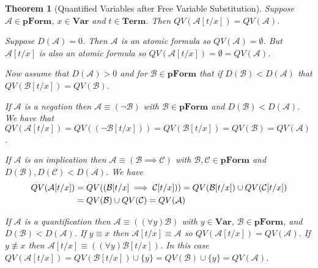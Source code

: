 \documentclass[12pt]{article}
\theoremstyle{break}
\theoremstyle{break}
\newtheorem{theorem}{Theorem}[section]
\theoremstyle{break}
\theoremstyle{break}
\theoremstyle{break}
\newtheorem{informal definition}[definition]{Informal Definition}
\newcommand{\mc}[1]{\mathcal{#1}}
\begin{document}
\begin{theorem}[Quantified Variables after Free Variable Substitution]
\label{thm:qvafterfvsub}
Suppose $\mc{A} \in \textbf{pForm}$, $x\in\textbf{Var}$ and $t\in \textbf{Term}$. Then $QV(\mc{A}[t/x]) = QV(\mc{A})$.

Suppose $D(\mc{A}) = 0$. Then $\mc{A}$ is an atomic formula so $QV(\mc{A}) = \emptyset$. But $\mc{A}[t/x]$ is also an atomic formula so $QV(\mc{A}[t/x]) = \emptyset = QV(\mc{A})$.

Now assume that $D(\mc{A})>0$ and for $\mc{B}\in \textbf{pForm}$ that if $D(\mc{B})<D(\mc{A})$ that $QV(\mc{B}[t/x]) = QV(\mc{B})$.

If $\mc{A}$ is a negation then $\mc{A}\equiv (\lnot \mc{B})$ with $\mc{B}\in\textbf{pForm}$ and $D(\mc{B}) < D(\mc{A})$. We have that $QV(\mc{A}[t/x]) = QV((\lnot \mc{B}[t/x])) = QV(\mc{B}[t/x]) = QV(\mc{B}) =  QV(\mc{A})$.

If $\mc{A}$ is an implication then $\mc{A} \equiv (\mc{B} \implies \mc{C})$ with $\mc{B}, \mc{C} \in \textbf{pForm}$ and $D(\mc{B}), D(\mc{C}) < D(\mc{A})$. We have
\begin{align}
QV(\mc{A}[t/x]) &= QV((\mc{B}[t/x]\implies \mc{C}[t/x])) = QV(\mc{B}[t/x]) \cup QV(\mc{C}[t/x]) \notag\\
&= QV(\mc{B}) \cup QV(\mc{C}) = QV(\mc{A}) \notag
\end{align}

If $\mc{A}$ is a quantification then $\mc{A} \equiv ((\forall y) \mc{B})$ with $y\in \textbf{Var}$, $\mc{B}\in\textbf{pForm}$, and $D(\mc{B}) < D(\mc{A})$. If $y\equiv x$ then $\mc{A}[t/x] \equiv \mc{A}$ so $QV(\mc{A}[t/x]) = QV(\mc{A})$. If $y\not \equiv x$ then $\mc{A}[t/x] \equiv ((\forall y) \mc{B}[t/x])$. In this case $QV(\mc{A}[t/x]) = QV(\mc{B}[t/x]) \cup \{y\} = QV(\mc{B})\cup\{y\} = QV(\mc{A})$.

\end{theorem}
\end{document}
